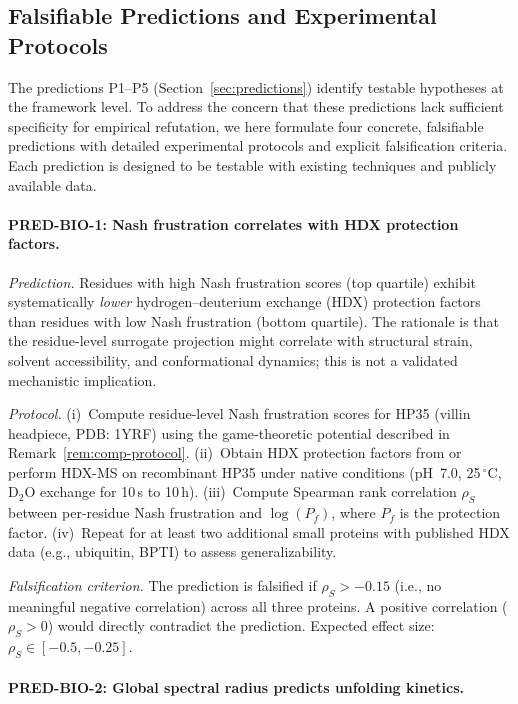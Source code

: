 \documentclass[12pt,a4paper]{article}
\theoremstyle{remark}
\begin{document}
\subsection{Falsifiable Predictions and Experimental Protocols}
\label{sec:falsifiable-predictions}

The predictions P1--P5 (Section~\ref{sec:predictions}) identify testable hypotheses at the framework level. To address the concern that these predictions lack sufficient specificity for empirical refutation, we here formulate four concrete, falsifiable predictions with detailed experimental protocols and explicit falsification criteria. Each prediction is designed to be testable with existing techniques and publicly available data.

\paragraph{PRED-BIO-1: Nash frustration correlates with HDX protection factors.}

\textit{Prediction.}
Residues with high Nash frustration scores (top quartile) exhibit systematically \emph{lower} hydrogen--deuterium exchange (HDX) protection factors than residues with low Nash frustration (bottom quartile). The rationale is that the residue-level surrogate projection might correlate with structural strain, solvent accessibility, and conformational dynamics; this is not a validated mechanistic implication.

\textit{Protocol.}
(i)~Compute residue-level Nash frustration scores for HP35 (villin headpiece, PDB: 1YRF) using the game-theoretic potential described in Remark~\ref{rem:comp-protocol}.
(ii)~Obtain HDX protection factors from \citet{McKnight1996} or perform HDX-MS on recombinant HP35 under native conditions (pH~7.0, 25$\,^\circ$C, $\text{D}_2\text{O}$ exchange for 10\,s to 10\,h).
(iii)~Compute Spearman rank correlation $\rho_S$ between per-residue Nash frustration and $\log(P_f)$, where $P_f$ is the protection factor.
(iv)~Repeat for at least two additional small proteins with published HDX data (e.g., ubiquitin, BPTI) to assess generalizability.

\textit{Falsification criterion.}
The prediction is falsified if $\rho_S > -0.15$ (i.e., no meaningful negative correlation) across all three proteins. A positive correlation ($\rho_S > 0$) would directly contradict the prediction. Expected effect size: $\rho_S \in [-0.5, -0.25]$.

\paragraph{PRED-BIO-2: Global spectral radius predicts unfolding kinetics.}
\end{document}
